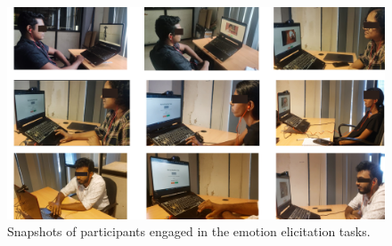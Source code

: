 \begin{figure}[h]
    \centering
    \includegraphics[width=1\textwidth]{img/chapter_03/participating.png}
    \caption{Snapshots of participants engaged in the emotion elicitation tasks.}
    \label{fig:participant_snapshots}
\end{figure}

